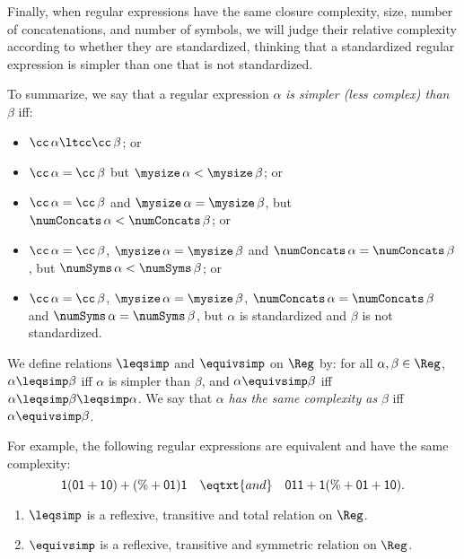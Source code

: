 Finally, when regular expressions have the same closure complexity,
size, number of concatenations, and number of symbols, we will judge
their relative complexity according to whether they are standardized,
thinking that a standardized regular expression is simpler than one
that is not standardized.

To summarize, we say that a regular expression $\alpha$ \emph{is
simpler (less complex) than} $\beta$ iff:
\begin{itemize}
\item $\cc\,\alpha \ltcc \cc\,\beta$; or

\item $\cc\,\alpha = \cc\,\beta$ but $\mysize\,\alpha < \mysize\,\beta$; or

\item $\cc\,\alpha = \cc\,\beta$ and $\mysize\,\alpha = \mysize\,\beta$,
  but $\numConcats\,\alpha < \numConcats\,\beta$; or

\item $\cc\,\alpha = \cc\,\beta$, $\mysize\,\alpha = \mysize\,\beta$
  and $\numConcats\,\alpha = \numConcats\,\beta$, but
  $\numSyms\,\alpha < \numSyms\,\beta$; or

\item $\cc\,\alpha = \cc\,\beta$, $\mysize\,\alpha = \mysize\,\beta$,
  $\numConcats\,\alpha = \numConcats\,\beta$ and $\numSyms\,\alpha =
  \numSyms\,\beta$, but $\alpha$ is standardized and $\beta$ is
  not standardized.
\end{itemize}
We define relations $\leqsimp$ and $\equivsimp$ on $\Reg$ by: for all
$\alpha,\beta\in\Reg$, $\alpha\leqsimp\beta$ iff $\alpha$ is simpler
than $\beta$, and $\alpha\equivsimp\beta$ iff
$\alpha\leqsimp\beta\leqsimp\alpha$.  We say that $\alpha$ \emph{has the
same complexity as} $\beta$ iff $\alpha\equivsimp\beta$.

For example, the following regular expressions are equivalent and have
the same complexity:
\begin{displaymath}
\mathsf{1(01 + 10) + (\% + 01)1} \quad\eqtxt{and}\quad
\mathsf{011 + 1(\% + 01 + 10)} .  
\end{displaymath}

\begin{proposition}
\begin{enumerate}[\quad(1)]
\item $\leqsimp$ is a reflexive, transitive and total relation on
  $\Reg$.

\item $\equivsimp$ is a reflexive, transitive and symmetric relation on
  $\Reg$.
\end{enumerate}
\end{proposition}

